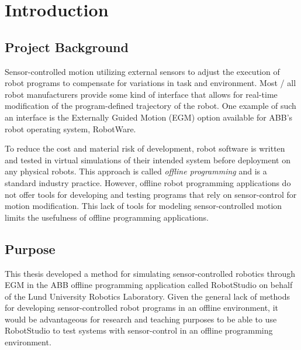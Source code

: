 \documentclass{cslthse-msc}
\begin{document}


\chapter{Introduction}
\label{sec:Intro}

\section{Project Background}
\label{sec:Intro:Proj_Back}
Sensor-controlled motion utilizing external sensors to adjust the execution of robot programs to compensate for variations in task and environment. Most / all robot manufacturers provide some kind of interface that allows for real-time modification of the program-defined trajectory of the robot. One example of such an interface is the Externally Guided Motion (EGM) option available for ABB's robot operating system, RobotWare. \par

To reduce the cost and material risk of development, robot software is written and tested in virtual simulations of their intended system before deployment on any physical robots. This approach is called \textit{offline programming} and is a standard industry practice. However, offline robot programming applications do not offer tools for developing and testing programs that rely on sensor-control for motion modification. This lack of tools for modeling sensor-controlled motion limits the usefulness of offline programming applications. \par

\section{Purpose}
\label{sec:Intro:Purpose}
This thesis developed a method for simulating sensor-controlled robotics through EGM in the ABB offline programming application called RobotStudio on behalf of the Lund University Robotics Laboratory. Given the general lack of methods for developing sensor-controlled robot programs in an offline environment, it would be advantageous for research and teaching purposes to be able to use RobotStudio to test systems with sensor-control in an offline programming environment.\par
\end{document}

